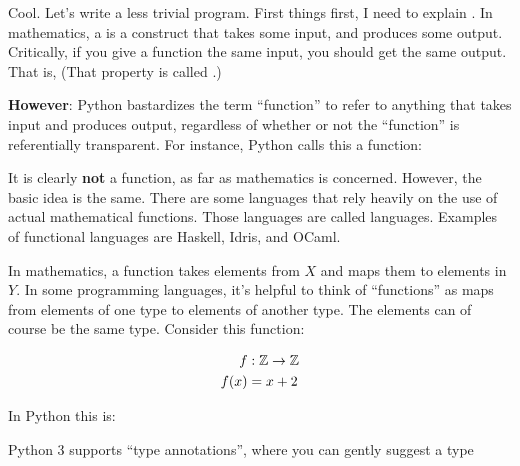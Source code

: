 
Cool. Let's write a less trivial program. First things first, I need
to explain . In mathematics, a  is a
construct that takes some input, and produces some output. Critically,
if you give a function the same input, you should get the same
output. That is,  (That
property is called .)

\textbf{However}: Python bastardizes the term ``function'' to refer to
anything that takes input and produces output, regardless of whether
or not the ``function'' is referentially transparent. For instance,
Python calls this a function:


It is clearly \textbf{not} a function, as far as mathematics is
concerned. However, the basic idea is the same. There are some
languages that rely heavily on the use of actual mathematical
functions. Those languages are called 
languages. Examples of functional languages are Haskell, Idris, and
OCaml.

In mathematics, a function  takes elements from $X$ and maps them to elements in $Y$. In
some programming languages, it's helpful to think of ``functions'' as
maps from elements of one type to elements of another type. The
elements can of course be the same type. Consider this function:

\begin{align*}
  f & : \mathbb{Z} \to \mathbb{Z} \\
  f(x) & = x + 2
\end{align*}

In Python this is:


Python 3 supports ``type annotations'', where you can gently suggest a type
